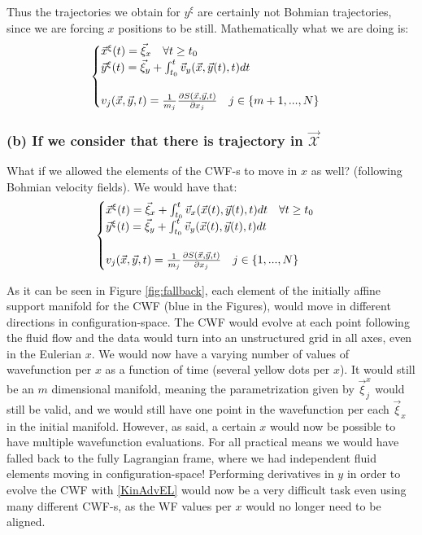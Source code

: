 \documentclass[11pt, a4paper]{article} %
\newcommand{\x}{\mathcal{X}}
\begin{document}
Thus the trajectories we obtain for $y^\xi$ are certainly not Bohmian trajectories, since we are forcing $x$ positions to be still. Mathematically what we are doing is:
\begin{equation}\label{a}
\begin{cases}
\vec{x}^\xi(t)=\vec{\xi}_x \quad \forall t\geq t_0\\
\vec{y}^\xi(t)=\vec{\xi}_y+\int_{t_0}^t \vec{v}_y(\vec{x}, \vec{y}(t),t)dt\\ \\
v_j(\vec{x}, \vec{y},t)=\frac{1}{m_j}\pdv{S(\vec{x}, \vec{y},t)}{x_j}\quad j\in\{m+1,...,N \}
\end{cases}
\end{equation}

\subsubsection*{(b) If we consider that there is trajectory in $\vec{\x}$}
What if we allowed the elements of the CWF-s to move in $x$ as well? (following Bohmian velocity fields). We would have that:
\begin{equation}
\begin{cases}\label{b}
\vec{x}^\xi(t)=\vec{\xi}_x +\int_{t_0}^t \vec{v}_x(\vec{x}(t), \vec{y}(t),t)dt\quad \forall t\geq t_0\\
\vec{y}^\xi(t)=\vec{\xi}_y+\int_{t_0}^t \vec{v}_y(\vec{x}(t), \vec{y}(t),t)dt\\ \\
v_j(\vec{x}, \vec{y},t)=\frac{1}{m_j}\pdv{S(\vec{x}, \vec{y},t)}{x_j}\quad j\in\{1,...,N \}
\end{cases}
\end{equation}

As it can be seen in Figure \ref{fig:fallback}, each element of the initially affine support manifold for the CWF (blue in the Figures), would move in different directions in configuration-space. The CWF would evolve at each point following the fluid flow and the data would turn into an unstructured grid in all axes, even in the Eulerian $x$. We would now have a varying number of values of wavefunction per $x$ as a function of time (several yellow dots per $x$). It would still be an $m$ dimensional manifold, meaning the parametrization given by $\vec{\xi}^x_j$ would still be valid, and we would still have one point in the wavefunction per each  $\vec{\xi}_x$ in the initial manifold. However, as said, a certain $x$ would now be possible to have multiple wavefunction evaluations. For all practical means we would have falled back to the fully Lagrangian frame, where we had independent fluid elements moving in configuration-space! Performing derivatives in $y$ in order to evolve the CWF with \eqref{KinAdvEL} would now be a very difficult task even using many different CWF-s, as the WF values per $x$ would no longer need to be aligned.
\end{document}
